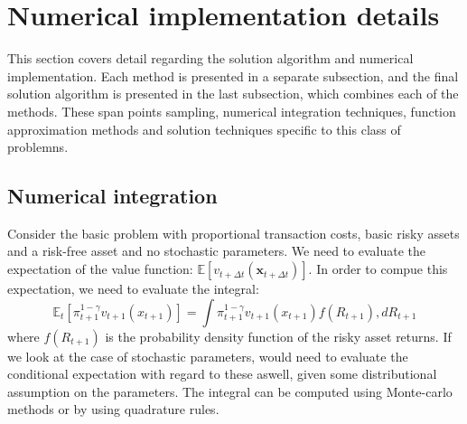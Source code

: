 \documentclass[11pt]{article}
\begin{document}
\fi

\section{Numerical implementation details} \label{Section: Implmentation-details}
This section covers detail regarding the solution algorithm and numerical implementation.
Each method is presented in a separate subsection, and the final solution algorithm is presented in the last subsection,
which combines each of the methods. These span points sampling, numerical integration techniques, function approximation methods
and solution techniques specific to this class of problemns.
\subsection{Numerical integration} \label{Subsection: NumericalIntegration}
Consider the basic problem with proportional transaction costs, basic risky assets and a risk-free asset and no stochastic parameters.
We need to evaluate the expectation of the value function:
$\mathbb{E} \left[ v_{t+\Delta t} (\mathbf{x}_{t+\Delta t }  ) \right]$.
In order to compue this expectation, we need to evaluate the integral:
\begin{equation}
  \mathbb{E}_{t} \left[ \pi_{t+1}^{1-\gamma} v_{t+1} (x_{t+1}) \right] = \int \pi_{t+1}^{1-\gamma} v_{t+1} (x_{t+1}) f(R_{t+1}), d R_{t+1}
\end{equation}
where $f(R_{t+1})$ is the probability density function of the risky asset returns. If we look at the case of stochastic parameters, 
would need to evaluate the conditional expectation with regard to these aswell, given some distributional assumption on the parameters.
The integral can be computed using Monte-carlo methods
or by using quadrature rules.
\end{document}
